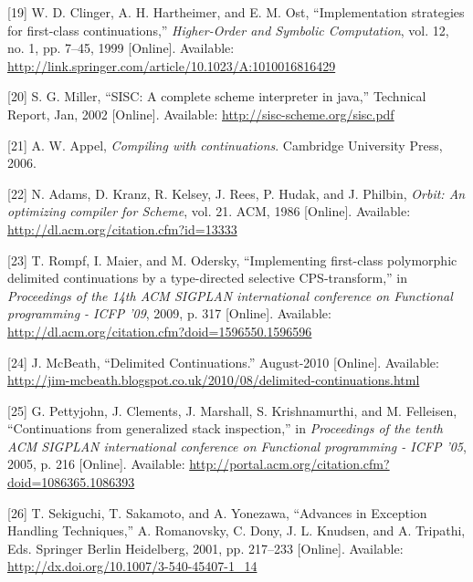 \documentclass[12pt,a4paper,oneside,openright]{book}
\begin{document}
{
{[}19{]} W. D. Clinger, A. H. Hartheimer, and E. M. Ost,
``Implementation strategies for first-class continuations,''
\emph{Higher-Order and Symbolic Computation}, vol. 12, no. 1, pp. 7--45,
1999 {[}Online{]}. Available:
\url{http://link.springer.com/article/10.1023/A:1010016816429}

{[}20{]} S. G. Miller, ``SISC: A complete scheme interpreter in java,''
Technical Report, Jan, 2002 {[}Online{]}. Available:
\url{http://sisc-scheme.org/sisc.pdf}

{[}21{]} A. W. Appel, \emph{Compiling with continuations}. Cambridge
University Press, 2006.

{[}22{]} N. Adams, D. Kranz, R. Kelsey, J. Rees, P. Hudak, and J.
Philbin, \emph{Orbit: An optimizing compiler for Scheme}, vol. 21. ACM,
1986 {[}Online{]}. Available:
\url{http://dl.acm.org/citation.cfm?id=13333}

{[}23{]} T. Rompf, I. Maier, and M. Odersky, ``Implementing first-class
polymorphic delimited continuations by a type-directed selective
CPS-transform,'' in \emph{Proceedings of the 14th ACM SIGPLAN
international conference on Functional programming - ICFP '09}, 2009, p.
317 {[}Online{]}. Available:
\url{http://dl.acm.org/citation.cfm?doid=1596550.1596596}

{[}24{]} J. McBeath, ``Delimited Continuations.'' August-2010
{[}Online{]}. Available:
\url{http://jim-mcbeath.blogspot.co.uk/2010/08/delimited-continuations.html}

{[}25{]} G. Pettyjohn, J. Clements, J. Marshall, S. Krishnamurthi, and
M. Felleisen, ``Continuations from generalized stack inspection,'' in
\emph{Proceedings of the tenth ACM SIGPLAN international conference on
Functional programming - ICFP '05}, 2005, p. 216 {[}Online{]}.
Available: \url{http://portal.acm.org/citation.cfm?doid=1086365.1086393}

{[}26{]} T. Sekiguchi, T. Sakamoto, and A. Yonezawa, ``Advances in
Exception Handling Techniques,'' A. Romanovsky, C. Dony, J. L. Knudsen,
and A. Tripathi, Eds. Springer Berlin Heidelberg, 2001, pp. 217--233
{[}Online{]}. Available:
\url{http://dx.doi.org/10.1007/3-540-45407-1_14}

}
\end{document}
